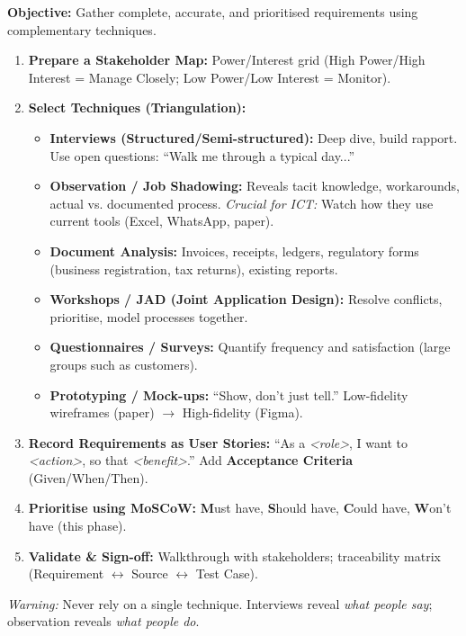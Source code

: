 \documentclass[11pt]{article}
\begin{document}
\begin{methode}
\textbf{Objective:} Gather complete, accurate, and prioritised requirements using complementary techniques.
\begin{enumerate}
    \item \textbf{Prepare a Stakeholder Map:} Power/Interest grid (High Power/High Interest = Manage Closely; Low Power/Low Interest = Monitor).
    \item \textbf{Select Techniques (Triangulation):}
    \begin{itemize}
        \item \textbf{Interviews (Structured/Semi-structured):} Deep dive, build rapport. Use open questions: ``Walk me through a typical day...''
        \item \textbf{Observation / Job Shadowing:} Reveals tacit knowledge, workarounds, actual vs. documented process. \emph{Crucial for ICT:} Watch how they use current tools (Excel, WhatsApp, paper).
        \item \textbf{Document Analysis:} Invoices, receipts, ledgers, regulatory forms (business registration, tax returns), existing reports.
        \item \textbf{Workshops / JAD (Joint Application Design):} Resolve conflicts, prioritise, model processes together.
        \item \textbf{Questionnaires / Surveys:} Quantify frequency and satisfaction (large groups such as customers).
        \item \textbf{Prototyping / Mock-ups:} ``Show, don't just tell.'' Low-fidelity wireframes (paper) $\to$ High-fidelity (Figma).
    \end{itemize}
    \item \textbf{Record Requirements as User Stories:} ``As a \emph{<role>}, I want to \emph{<action>}, so that \emph{<benefit>}.'' Add \textbf{Acceptance Criteria} (Given/When/Then).
    \item \textbf{Prioritise using MoSCoW:} \textbf{M}ust have, \textbf{S}hould have, \textbf{C}ould have, \textbf{W}on't have (this phase).
    \item \textbf{Validate \& Sign-off:} Walkthrough with stakeholders; traceability matrix (Requirement $\leftrightarrow$ Source $\leftrightarrow$ Test Case).
\end{enumerate}
\emph{Warning:} Never rely on a single technique. Interviews reveal \emph{what people say}; observation reveals \emph{what people do}.
\end{methode}
\end{document}
